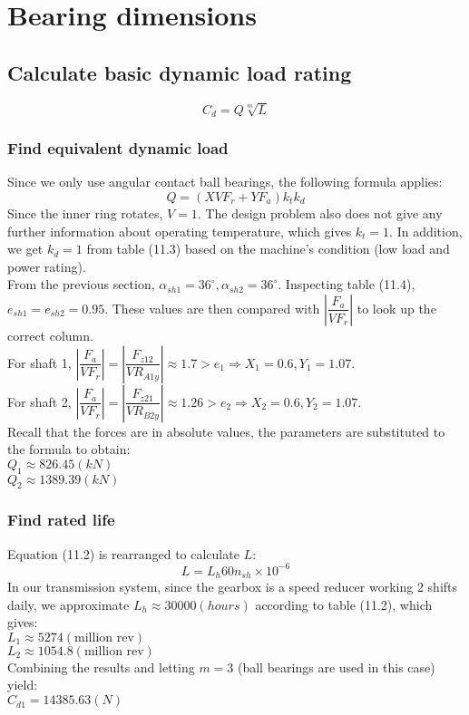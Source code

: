 \section{Bearing dimensions}
\subsection{Calculate basic dynamic load rating}
\[C_d = Q\sqrt[m]{L}\]
\subsubsection{Find equivalent dynamic load} Since we only use angular contact ball bearings, the following formula applies:
\[Q = (XVF_r+YF_a)k_tk_d\]
Since the inner ring rotates, $ V = 1 $. The design problem also does not give any further information about operating temperature, which gives $ k_t = 1 $. In addition, we get $ k_d = 1 $ from table (11.3) based on the machine's condition (low load and power rating).\\
From the previous section, $ \alpha_{sh1} = 36^\circ, \alpha_{sh2} = 36^\circ $. Inspecting table (11.4), $ e_{sh1} = e_{sh2} = 0.95 $. These values are then compared with $ \left| \dfrac{F_a}{VF_r} \right| $ to look up the correct column.\\
For shaft 1, $ \left| \dfrac{F_a}{VF_r} \right| = \left| \dfrac{F_{z12}}{VR_{A1y}} \right| \approx 1.7 > e_{1} \Rightarrow X_{1} = 0.6, Y_{1} = 1.07$.\\
For shaft 2, $ \left| \dfrac{F_a}{VF_r} \right| = \left| \dfrac{F_{z21}}{VR_{B2y}} \right| \approx 1.26 > e_{2} \Rightarrow X_{2} = 0.6, Y_{2} = 1.07$.\\
Recall that the forces are in absolute values, the parameters are substituted to the formula to obtain:\\
$ Q_1 \approx 826.45 \unit{(kN)} $\\
$ Q_2 \approx 1389.39 \unit{(kN)} $

\subsubsection{Find rated life}
Equation (11.2) is rearranged to calculate $ L $:
\[L = L_h60n_{sh}\times10^{-6}\]
In our transmission system, since the gearbox is a speed reducer working 2 shifts daily, we approximate $ L_h \approx 30000 \unit{(hours)}$ according to table (11.2), which gives:\\
$ L_1 \approx 5274 \unit{(\text{million rev})} $\\
$ L_2 \approx 1054.8 \unit{(\text{million rev})} $\\
Combining the results and letting $ m=3 $ (ball bearings are used in this case) yield:\\
$ C_{d1} = 14385.63 \unit{(N)} $
